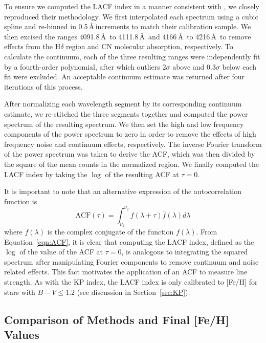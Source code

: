 \documentclass{emulateapj-rtx4}
\begin{document}
To ensure we computed the LACF index in a manner consistent with \citet{brn+99}, we 
closely reproduced their methodology. We
first interpolated each spectrum using a cubic spline and re-binned
in 0.5\,\AA\,increments to match their calibration sample.
We then excised the ranges 4091.8\,\AA\, to 4111.8\,\AA\, and 4166\,\AA\, to 4216\,\AA\, 
to remove effects from the H$\delta$ region and CN molecular absorption, respectively. To calculate the continuum,
each of the three resulting ranges were independently fit by a fourth-order polynomial, 
after which outliers 2$\sigma$ above and 0.3$\sigma$ below each fit were excluded. 
An acceptable continuum estimate was returned after four iterations of this
process. 

After normalizing each wavelength segment by its corresponding continuum 
estimate, we re-stitched the three segments together and computed the power spectrum
of the resulting spectrum. We then set the high and low frequency components 
of the power spectrum to zero in order to remove the effects of high frequency 
noise and continuum effects, respectively. The inverse Fourier 
transform of the power spectrum was taken to derive the ACF, which was 
then divided by the square of the mean counts in the normalized region. 
We finally computed the LACF index by taking the $\log$ of the resulting ACF at $\tau = 0$.

It is important to note that an alternative expression of the autocorrelation function is 
\begin{equation}
\text{ACF}(\tau) = \int_{\nu_1}^{\nu_2} f(\lambda + \tau) \bar{f}(\lambda)d\lambda
\label{eqn:ACF}
\end{equation}
where $\bar{f}(\lambda)$ is the complex conjugate of the function $f(\lambda)$.
From Equation~\ref{eqn:ACF}, it is clear that computing the LACF index, defined
as the $\log$ of the value of the ACF at $\tau = 0$,
is analogous to integrating the squared spectrum after manipulating 
Fourier components to remove continuum and noise related effects.
This fact motivates the application of an ACF to measure line strength.
As with the KP index, the LACF index is only calibrated to [Fe/H] for stars 
with $B-V \le 1.2$ (see discussion in Section~\ref{sec:KP}).

\subsection{Comparison of Methods and Final [Fe/H] Values}
\end{document}
